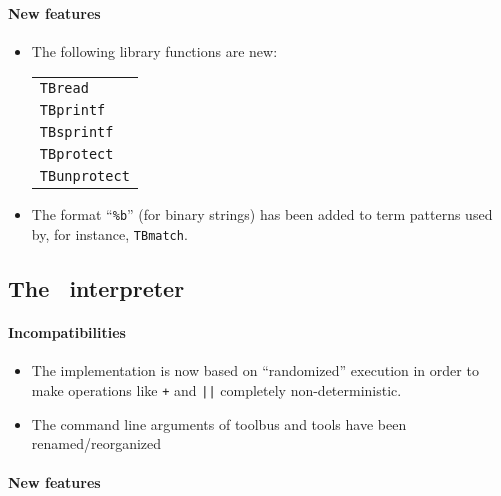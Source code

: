 \documentclass[a4,twoside,noweb]{article} %
\begin{document}
\paragraph{New features}

\begin{itemize}
\item The following library functions are new:
\begin{tabular}{l}
	{\tt TBread}\\
	{\tt TBprintf}\\
	{\tt TBsprintf}\\
	{\tt TBprotect}\\
	{\tt TBunprotect}
\end{tabular}
\item The format ``\verb+%b+'' (for binary strings) has been added to term patterns 
  used by, for instance, {\tt TBmatch}.

\end{itemize}

\subsection{The \TB\ interpreter}

\paragraph{Incompatibilities}

\begin{itemize}

\item The implementation is now based on ``randomized'' execution
in order to make operations like {\tt +} and {\tt ||}
completely non-deterministic.
\item The command line arguments of toolbus and tools have been
  renamed/reorganized

\end{itemize}

\paragraph{New features}
\end{document}
